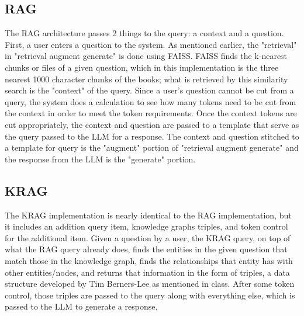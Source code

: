 \subsection{RAG}
The RAG architecture passes 2 things to the query: a context and a question. First, a user enters a question to the system. As mentioned earlier, the "retrieval" in "retrieval augment generate" is done using FAISS. FAISS finds the k-nearest chunks or files of a given question, which in this implementation is the three nearest 1000 character chunks of the books; what is retrieved by this similarity search is the "context" of the query. Since a user's question cannot be cut from a query, the system does a calculation to see how many tokens need to be cut from the context in order to meet the token requirements. Once the context tokens are cut appropriately, the context and question are passed to a template that serve as the query passed to the LLM for a response. The context and question stitched to a template for query is the "augment" portion of "retrieval augment generate" and the response from the LLM is the "generate" portion.

\subsection{KRAG}
The KRAG implementation is nearly identical to the RAG implementation, but it includes an addition query item, knowledge graphs triples, and token control for the additional item. Given a question by a user, the KRAG query, on top of what the RAG query already does, finds the entities in the given question that match those in the knowledge graph, finds the relationships that entity has with other entities/nodes, and returns that information in the form of triples, a data structure developed by Tim Berners-Lee as mentioned in class. After some token control, those triples are passed to the query along with everything else, which is passed to the LLM to generate a response.

\bigskip